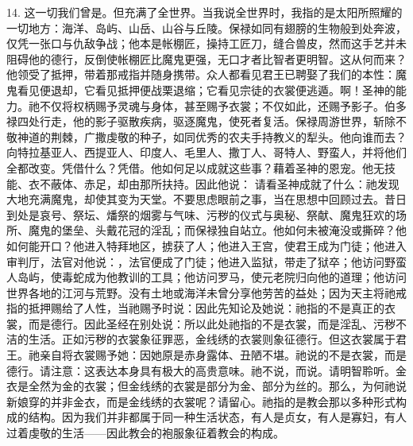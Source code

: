 14. 这一切我们曾是。但充满了全世界。当我说全世界时，我指的是太阳所照耀的一切地方：海洋、岛屿、山岳、山谷与丘陵。保禄如同有翅膀的生物般到处奔波，仅凭一张口与仇敌争战；他本是帐棚匠，操持工匠刀，缝合兽皮，然而这手艺并未阻碍他的德行，反倒使帐棚匠比魔鬼更强，无口才者比智者更明智。这从何而来？他领受了抵押，带着那戒指并随身携带。众人都看见君王已聘娶了我们的本性：魔鬼看见便退却，它看见抵押便战栗退缩；它看见宗徒的衣裳便逃遁。啊！圣神的能力。祂不仅将权柄赐予灵魂与身体，甚至赐予衣裳；不仅如此，还赐予影子。伯多禄四处行走，他的影子驱散疾病，驱逐魔鬼，使死者复活。保禄周游世界，斩除不敬神道的荆棘，广撒虔敬的种子，如同优秀的农夫手持教义的犁头。他向谁而去？向特拉基亚人、西提亚人、印度人、毛里人、撒丁人、哥特人、野蛮人，并将他们全都改变。凭借什么？凭借。他如何足以成就这些事？藉着圣神的恩宠。他无技能、衣不蔽体、赤足，却由那所扶持。因此他说：  请看圣神成就了什么：祂发现大地充满魔鬼，却使其变为天堂。不要思虑眼前之事，当在思想中回顾过去。昔日到处是哀号、祭坛、燔祭的烟雾与气味、污秽的仪式与奥秘、祭献、魔鬼狂欢的场所、魔鬼的堡垒、头戴花冠的淫乱；而保禄独自站立。他如何未被淹没或撕碎？他如何能开口？他进入特拜地区，掳获了人；他进入王宫，使君王成为门徒；他进入审判厅，法官对他说：，法官便成了门徒；他进入监狱，带走了狱卒；他访问野蛮人岛屿，使毒蛇成为他教训的工具；他访问罗马，使元老院归向他的道理；他访问世界各地的江河与荒野。没有土地或海洋未曾分享他劳苦的益处；因为天主将祂戒指的抵押赐给了人性，当祂赐予时说：因此先知论及她说：祂指的不是真正的衣裳，而是德行。因此圣经在别处说：所以此处祂指的不是衣裳，而是淫乱、污秽不洁的生活。正如污秽的衣裳象征罪恶，金线绣的衣裳则象征德行。但这衣裳属于君王。祂亲自将衣裳赐予她：因她原是赤身露体、丑陋不堪。祂说的不是衣裳，而是德行。请注意：这表达本身具有极大的高贵意味。祂不说，而说。请明智聆听。金衣是全然为金的衣裳；但金线绣的衣裳是部分为金、部分为丝的。那么，为何祂说新娘穿的并非金衣，而是金线绣的衣裳呢？请留心。祂指的是教会那以多种形式构成的结构。因为我们并非都属于同一种生活状态，有人是贞女，有人是寡妇，有人过着虔敬的生活——因此教会的袍服象征着教会的构成。\par

